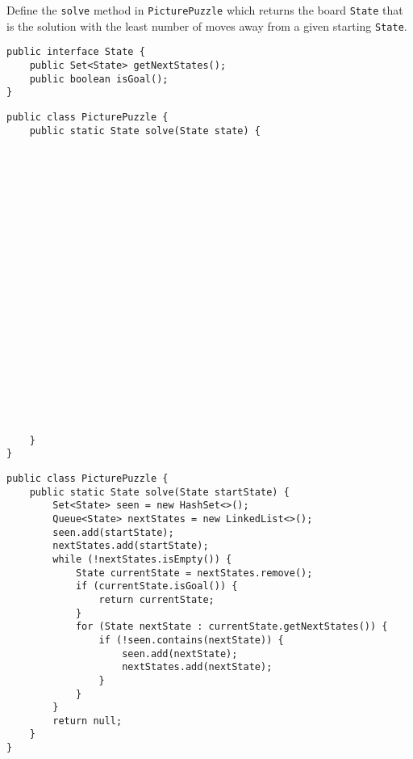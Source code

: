 \question Define the \texttt{solve} method in \texttt{PicturePuzzle} which returns the board \texttt{State} that is the solution with the least number of moves away from a given starting \texttt{State}.

\begin{lstlisting}
public interface State {
    public Set<State> getNextStates();
    public boolean isGoal();
}
\end{lstlisting}

\ifprintanswers\else
\begin{lstlisting}
public class PicturePuzzle {
    public static State solve(State state) {






















    }
}
\end{lstlisting}
\fi

\begin{solution}
\begin{lstlisting}
public class PicturePuzzle {
    public static State solve(State startState) {
        Set<State> seen = new HashSet<>();
        Queue<State> nextStates = new LinkedList<>();
        seen.add(startState);
        nextStates.add(startState);
        while (!nextStates.isEmpty()) {
            State currentState = nextStates.remove();
            if (currentState.isGoal()) {
                return currentState;
            }
            for (State nextState : currentState.getNextStates()) {
                if (!seen.contains(nextState)) {
                    seen.add(nextState);
                    nextStates.add(nextState);
                }
            }
        }
        return null;
    }
}
\end{lstlisting}
\end{solution}